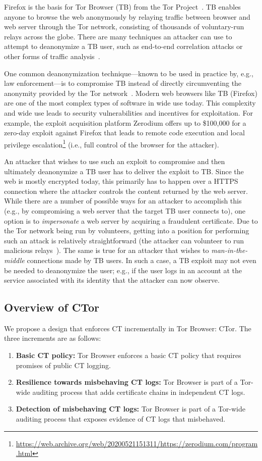 Firefox is the basis for Tor Browser (TB) from the Tor Project~\cite{tor}. TB
enables anyone to browse the web anonymously by relaying traffic between browser
and web server through the Tor network, consisting of thousands of voluntary-run
relays across the globe. There are many techniques an attacker can use to
attempt to deanonymize a TB user, such as end-to-end correlation attacks or
other forms of traffic analysis~\cite{tor, FIXME}. 

One common deanonymization technique---known to be used in practice by, e.g., law
enforcement---is to compromise TB instead of directly circumventing the anonymity
provided by the Tor network~\cite{FIXME}. Modern web browsers like TB (Firefox)
are one of the most complex types of software in wide use today. This complexity
and wide use leads to security vulnerabilities and incentives for exploitation.
For example, the exploit acquisition platform Zerodium offers up to \$100,000
for a zero-day exploit against Firefox that leads to remote code execution and
local privilege
escalation\footnote{\url{https://web.archive.org/web/20200521151311/https://zerodium.com/program.html}}
(i.e., full control of the browser for the attacker).

An attacker that wishes to use such an exploit to compromise and then ultimately
deanonymize a TB user has to deliver the exploit to TB. Since the web is mostly
encrypted today, this primarily has to happen over a HTTPS connection where the
attacker controls the content returned by the web server. While there are a
number of possible ways for an attacker to accomplish this (e.g., by
compromising a web server that the target TB user connects to), one option is to
\emph{impersonate} a web server by acquiring a fraudulent certificate. Due to the
Tor network being run by volunteers, getting into a position for performing such
an attack is relatively straightforward (the attacker can volunteer to run
malicious relays~\cite{spoiled-onions}). The same is true for an attacker that
wishes to \emph{man-in-the-middle} connections made by TB users. In such a case,
a TB exploit may not even be needed to deanonymize the user; e.g., if the user
logs in an account at the service associated with its identity that the attacker
can now observe.

\subsection{Overview of CTor}
We propose a design that enforces CT incrementally in Tor Browser: CTor.  The
three increments are as follows:
\begin{enumerate}
	\item \textbf{Basic CT policy:}
		Tor Browser enforces a basic CT policy that requires promises of public
		CT logging.
	\item \textbf{Resilience towards misbehaving CT logs:}
		Tor Browser is part of a Tor-wide auditing process that adds certificate
		chains in independent CT logs.
	\item \textbf{Detection of misbehaving CT logs:}
		Tor Browser is part of a Tor-wide auditing process that exposes evidence
		of CT logs that misbehaved.
\end{enumerate}

